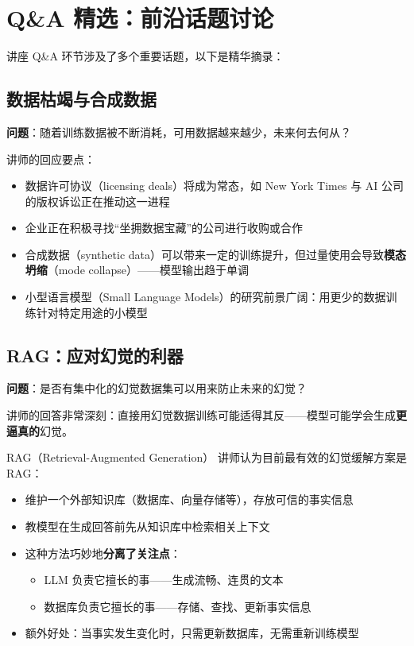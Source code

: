 \section{Q\&A 精选：前沿话题讨论}

讲座 Q\&A 环节涉及了多个重要话题，以下是精华摘录：

\subsection{数据枯竭与合成数据}

\textbf{问题}：随着训练数据被不断消耗，可用数据越来越少，未来何去何从？

讲师的回应要点：
\begin{itemize}
    \item 数据许可协议（licensing deals）将成为常态，如 New York Times 与 AI 公司的版权诉讼正在推动这一进程
    \item 企业正在积极寻找``坐拥数据宝藏''的公司进行收购或合作
    \item 合成数据（synthetic data）可以带来一定的训练提升，但过量使用会导致\textbf{模态坍缩}（mode collapse）——模型输出趋于单调
    \item 小型语言模型（Small Language Models）的研究前景广阔：用更少的数据训练针对特定用途的小模型
\end{itemize}

\subsection{RAG：应对幻觉的利器}

\textbf{问题}：是否有集中化的幻觉数据集可以用来防止未来的幻觉？

讲师的回答非常深刻：直接用幻觉数据训练可能适得其反——模型可能学会生成\textbf{更逼真的}幻觉。

\begin{importantbox}{RAG（Retrieval-Augmented Generation）}
讲师认为目前最有效的幻觉缓解方案是 RAG：
\begin{itemize}
    \item 维护一个外部知识库（数据库、向量存储等），存放可信的事实信息
    \item 教模型在生成回答前先从知识库中检索相关上下文
    \item 这种方法巧妙地\textbf{分离了关注点}：
    \begin{itemize}
        \item LLM 负责它擅长的事——生成流畅、连贯的文本
        \item 数据库负责它擅长的事——存储、查找、更新事实信息
    \end{itemize}
    \item 额外好处：当事实发生变化时，只需更新数据库，无需重新训练模型
\end{itemize}
\end{importantbox}

